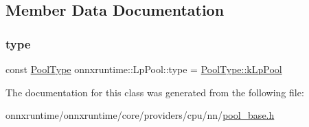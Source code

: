 \subsection{Member Data Documentation}
\mbox{\label{classonnxruntime_1_1LpPool_a9953e01493d041c462c59a49e6d6f007}} 
\subsubsection{\texorpdfstring{type}{type}}
{\footnotesize\ttfamily const \mbox{\hyperlink{namespaceonnxruntime_aa4ff52f19ea8c4d3e4ce3ffbabbc7060}{Pool\+Type}} onnxruntime\+::\+Lp\+Pool\+::type = \mbox{\hyperlink{namespaceonnxruntime_aa4ff52f19ea8c4d3e4ce3ffbabbc7060a386cc7744fd4f4a934f933df6d105fd4}{Pool\+Type\+::k\+Lp\+Pool}}\hspace{0.3cm}{\ttfamily [static]}}



The documentation for this class was generated from the following file\+:\begin{DoxyCompactItemize}
\item 
onnxruntime/onnxruntime/core/providers/cpu/nn/\mbox{\hyperlink{pool__base_8h}{pool\+\_\+base.\+h}}\end{DoxyCompactItemize}
